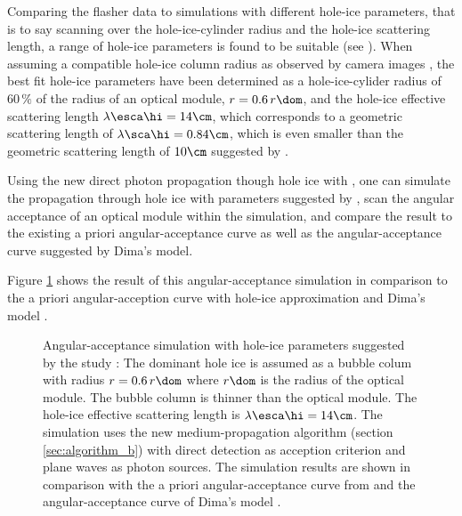 Comparing the flasher data to simulations with different hole-ice parameters, that is to say scanning over the hole-ice-cylinder radius and the hole-ice scattering length, a range of hole-ice parameters is found to be suitable (see ). When assuming a compatible hole-ice column radius as observed by camera images \cite{rongenswedishcamera}, the best fit hole-ice parameters have been determined as a hole-ice-cylider radius of $60\,\%$ of the radius of an optical module, $r=0.6\,r\dom$, and the hole-ice effective scattering length $\lambda\esca\hi = 14\cm$, which corresponds to a geometric scattering length of $\lambda\sca\hi = 0.84\cm$, which is even smaller than the geometric scattering length of $10\cm$ suggested by . \cite{martinspicehddard}

Using the new direct photon propagation though hole ice with \clsim, one can simulate the propagation through hole ice with parameters suggested by , scan the angular acceptance of an optical module within the simulation, and compare the result to the existing a priori angular-acceptance curve as well as the angular-acceptance curve suggested by Dima's model.


Figure \ref{fig:ku3Zie8z} shows the result of this angular-acceptance simulation in comparison to the a priori angular-acception curve with hole-ice approximation \cite{icepaper} and Dima's model \cite{flasherdataderivedicemodels}.

\begin{figure}[htbp]
  \caption{Angular-acceptance simulation with hole-ice parameters suggested by the  study \cite{martinspicehddard}: The dominant hole ice is assumed as a bubble colum with radius $r = 0.6\,r\dom$ where $r\dom$ is the radius of the optical module. The bubble column is thinner than the optical module. The hole-ice effective scattering length is $\lambda\esca\hi = 14\cm$. The simulation uses the new medium-propagation algorithm (section \ref{sec:algorithm_b}) with direct detection as acception criterion and plane waves as photon sources. The simulation results are shown in comparison with the a priori angular-acceptance curve from \cite{icepaper} and the angular-acceptance curve of Dima's model \cite{flasherdataderivedicemodels}.}
  \label{fig:ku3Zie8z}
\end{figure}


